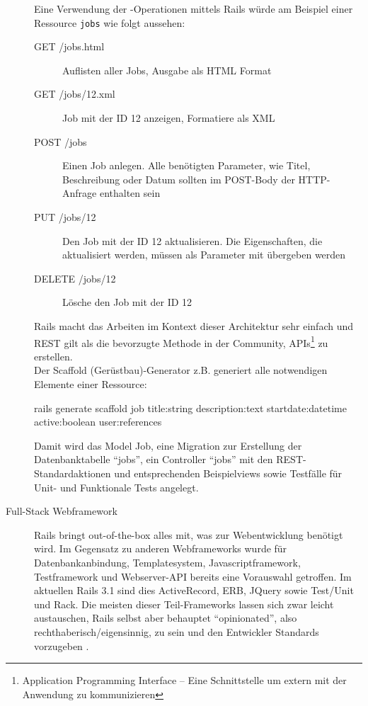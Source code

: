 \begin{description}
 Eine Verwendung der -Operationen mittels Rails würde am Beispiel einer Ressource \texttt{jobs} wie folgt aussehen:
  \begin{description}
  \item[GET /jobs.html] Auflisten aller Jobs, Ausgabe als HTML Format
  \item[GET /jobs/12.xml] Job mit der ID 12 anzeigen, Formatiere als XML
  \item[POST /jobs] Einen Job anlegen. Alle benötigten Parameter, wie Titel, Beschreibung oder Datum sollten im POST-Body der HTTP-Anfrage enthalten sein
  \item[PUT /jobs/12] Den Job mit der ID 12 aktualisieren. Die Eigenschaften, die aktualisiert werden, müssen als Parameter mit übergeben werden
  \item[DELETE /jobs/12] Lösche den Job mit der ID 12
  \end{description}
 Rails macht das Arbeiten im Kontext dieser Architektur sehr einfach und REST gilt als die bevorzugte Methode in der Community, APIs\footnote{Application Programming Interface --  Eine Schnittstelle um extern mit der Anwendung zu kommunizieren} zu erstellen.
\\ Der Scaffold (Gerüstbau)-Generator z.B. generiert alle notwendigen Elemente einer Ressource:
\begin{ruby}[label=test/test\_feed.rb]
rails generate scaffold job title:string description:text 
  start\PYZus{}date:datetime active:boolean user:references
\end{ruby}
  Damit wird das Model Job, eine Migration zur Erstellung der Datenbanktabelle "`jobs"', ein Controller "`jobs"' mit den REST-Standardaktionen und entsprechenden Beispielviews sowie Testfälle für Unit- und Funktionale Tests angelegt. \\
 \item[Full-Stack Webframework] Rails bringt out-of-the-box alles mit, was zur Webentwicklung benötigt wird. Im Gegensatz zu anderen Webframeworks wurde für Datenbankanbindung, Templatesystem, Javascriptframework, Testframework und Webserver-API bereits eine Vorauswahl getroffen. Im aktuellen Rails 3.1 sind dies ActiveRecord, ERB, JQuery sowie Test/Unit und Rack. Die meisten dieser Teil-Frameworks lassen sich zwar leicht austauschen, Rails selbst aber behauptet "`opinionated"', also rechthaberisch/eigensinnig, zu sein und den Entwickler Standards vorzugeben \citep{david_heinemeier_hansson_railsconf_2011}.

\end{description}

